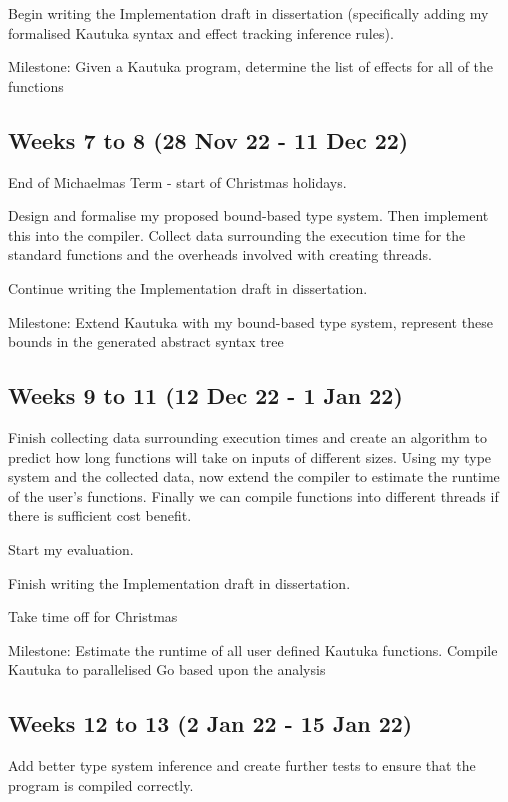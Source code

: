 \begin{refsection}
  Begin writing the Implementation draft in dissertation (specifically adding my formalised Kautuka syntax and effect tracking inference rules).

  Milestone: Given a Kautuka program, determine the list of effects for all of the functions 

  \subsection*{Weeks 7 to 8 (28 Nov 22 - 11 Dec 22)}
  End of Michaelmas Term - start of Christmas holidays.

  Design and formalise my proposed bound-based type system. Then implement this into the compiler. Collect data surrounding the execution time for the standard functions and the overheads involved with creating threads.

  Continue writing the Implementation draft in dissertation.

  Milestone: Extend Kautuka with my bound-based type system, represent these bounds in the generated abstract syntax tree 

  \subsection*{Weeks 9 to 11 (12 Dec 22 - 1 Jan 22)}

  Finish collecting data surrounding execution times and create an algorithm to predict how long functions will take on inputs of different sizes. Using my type system and the collected data, now extend the compiler to estimate the runtime of the user's functions. Finally we can compile functions into different threads if there is sufficient cost benefit.

  Start my evaluation.

  Finish writing the Implementation draft in dissertation.

  Take time off for Christmas

  Milestone: Estimate the runtime of all user defined Kautuka functions. Compile Kautuka to parallelised Go based upon the analysis 

  \subsection*{Weeks 12 to 13 (2 Jan 22 - 15 Jan 22)}

  Add better type system inference and create further tests to ensure that the program is compiled correctly. 


\end{refsection}
